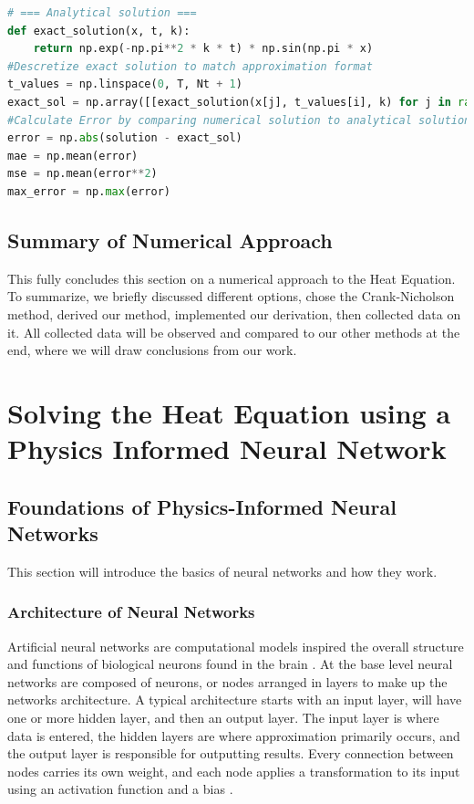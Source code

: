 \documentclass[12pt, reqno]{amsart}
\begin{document}
\begin{lstlisting}[language=Python, title = Data Collection and Error Calculation]
# === Analytical solution ===
def exact_solution(x, t, k):
    return np.exp(-np.pi**2 * k * t) * np.sin(np.pi * x)
#Descretize exact solution to match approximation format
t_values = np.linspace(0, T, Nt + 1)
exact_sol = np.array([[exact_solution(x[j], t_values[i], k) for j in range(Nx)] for i in range(Nt + 1)])
#Calculate Error by comparing numerical solution to analytical solution
error = np.abs(solution - exact_sol)
mae = np.mean(error)
mse = np.mean(error**2)
max_error = np.max(error)
\end{lstlisting}

\subsection{Summary of Numerical Approach}
This fully concludes this section on a numerical approach to the Heat Equation. To summarize, we briefly discussed different options, chose the Crank-Nicholson method, derived our method, implemented our derivation, then collected data on it. All collected data will be observed and compared to our other methods at the end, where we will draw conclusions from our work.


\section{Solving the Heat Equation using a Physics Informed Neural Network}
\subsection{Foundations of Physics-Informed Neural Networks}
This section will introduce the basics of neural networks and how they work.
\subsubsection{Architecture of Neural Networks}
Artificial neural networks are computational models inspired the overall structure and functions of biological neurons found in the brain \cite{4}. At the base level neural networks are composed of neurons, or nodes arranged in layers to make up the networks architecture. A typical architecture starts with an input layer, will have one or more hidden layer, and then an output layer. The input layer is where data is entered, the hidden layers are where approximation primarily occurs, and the output layer is responsible for outputting results. Every connection between nodes carries its own weight, and each node applies a transformation to its input using an activation function and a bias \cite{4}. 
\end{document}
